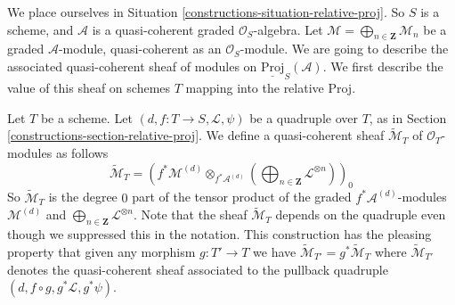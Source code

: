\medskip\noindent
We place ourselves in Situation \ref{constructions-situation-relative-proj}.
So $S$ is a scheme, and
$\mathcal{A}$ is a quasi-coherent graded $\mathcal{O}_S$-algebra.
Let $\mathcal{M} = \bigoplus_{n \in \mathbf{Z}} \mathcal{M}_n$
be a graded $\mathcal{A}$-module, quasi-coherent as an $\mathcal{O}_S$-module.
We are going to describe the associated quasi-coherent sheaf
of modules on $\underline{\text{Proj}}_S(\mathcal{A})$.
We first describe the value of this sheaf on schemes $T$ mapping
into the relative Proj.

\medskip\noindent
Let $T$ be a scheme. Let $(d, f : T \to S, \mathcal{L}, \psi)$
be a quadruple over $T$, as in Section \ref{constructions-section-relative-proj}.
We define a quasi-coherent sheaf
$\widetilde{\mathcal{M}}_T$ of $\mathcal{O}_T$-modules
as follows
\begin{equation}
\label{equation-widetilde-M}
\widetilde{\mathcal{M}}_T =
\left(
f^*\mathcal{M}^{(d)}
\otimes_{f^*\mathcal{A}^{(d)}}
\left(\bigoplus\nolimits_{n \in \mathbf{Z}} \mathcal{L}^{\otimes n}\right)
\right)_0
\end{equation}
So $\widetilde{\mathcal{M}}_T$ is the degree $0$ part
of the tensor product of the graded $f^*\mathcal{A}^{(d)}$-modules
$\mathcal{M}^{(d)}$ and
$\bigoplus\nolimits_{n \in \mathbf{Z}} \mathcal{L}^{\otimes n}$.
Note that the sheaf $\widetilde{\mathcal{M}}_T$ depends on the quadruple
even though we suppressed this in the notation.
This construction has the pleasing property that
given any morphism $g : T' \to T$ we have
$\widetilde{\mathcal{M}}_{T'} = g^*\widetilde{\mathcal{M}}_T$
where $\widetilde{\mathcal{M}}_{T'}$ denotes the quasi-coherent
sheaf associated to the pullback quadruple
$(d, f \circ g, g^*\mathcal{L}, g^*\psi)$.

